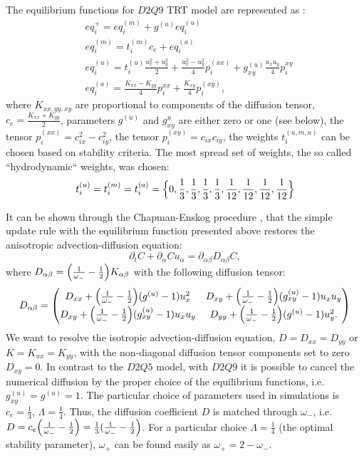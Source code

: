\documentclass{article}
\newcommand{\beq}{\begin{equation}}
\newcommand{\feq}{\end{equation}}
\newcommand{\omegaplus}{\omega_{+}}
\newcommand{\omegaminus}{\omega_{-}}
\begin{document}
The equilibrium functions for $D2Q9$ TRT model are represented as \cite{kuzmin-stability-optimal}:
\begin{equation}
\begin{aligned}
&eq_i^{+}=eq_i^{(m)}+g^{(u)} eq_i^{(u)}\\
&eq_i^{(m)}=t_i^{(m)} c_e+ eq_i^{(a)}\\
&eq_i^{(u)}=t_i^{(u)} \frac{u_x^2+u_y^2}{2}+\frac{u_x^2-u_y^2}{4} p_i^{(xx)}+g_{xy}^{(u)}\frac{u_x
u_y}{4} p_i^{xy}\\
&eq_i^{(a)}=\frac{K_{xx}-K_{yy}}{4} p_i^{xx}+\frac{K_{xy}}{4} p_i^{(xy)},
\end{aligned}
\end{equation}
where $K_{xx,yy,xy}$ are proportional to components of the diffusion tensor,
$c_e=\frac{K_{xx}+K_{yy}}{2}$, parameters $g^{(u)}$ and $g^{u}_{xy}$ are either zero or one (see
below), the tensor $p_i^{(xx)}=c_{ix}^2-c_{iy}^2$, the tensor $p_i^{(xy)}=c_{ix} c_{iy}$, the
weights
$t_i^{(u,m,a)}$ can be chosen based on stability criteria. The most spread set of weights, the so called
``hydrodynamic`` weights, was chosen:
\begin{equation}
t_i^{(u)}=t_i^{(m)}=t_i^{(a)}=\Bigl\{0,\frac{1}{3},\frac{1}{3},\frac{1}{3},\frac{1}{3},\frac{1}{12},
\frac {1}{12},\frac{1}{12},\frac{1}{12}\Bigr\}
\end{equation}
 
It can be shown through the Chapman-Enskog procedure \cite{chapman}, that the simple update rule
with the equilibrium function presented above restores the anisotropic
advection-diffusion equation:
\beq
\partial_t C+ \partial_{\alpha} C u_{\alpha}=\partial_{\alpha\beta} D_{\alpha\beta} C,
\feq
where $D_{\alpha\beta}=\Bigl(\frac{1}{\omegaminus}-\frac{1}{2}\Bigr)K_{\alpha\beta}$
with the
following diffusion tensor:
\begin{equation}
D_{\alpha\beta}=
\begin{pmatrix}
D_{xx} + \Bigl(\frac{1}{\omegaminus}-\frac{1}{2}\Bigr)(g^{(u)}-1) u_x^2 &
D_{xy}+\Bigl(\frac{1}{\omegaminus}-\frac{1}{2}\Bigr)(g_{xy}^{(u)}-1)u_x u_y\\
D_{xy} + \Bigl(\frac{1}{\omegaminus}-\frac{1}{2}\Bigr)(g_{xy}^{(u)}-1) u_x u_y&
D_{yy}+\Bigl(\frac{1}{\omegaminus}-\frac{1}{2}\Bigr)(g^{(u)}-1) u_y^2. 
\end{pmatrix}
\end{equation}
We want to resolve the isotropic advection-diffusion equation, $D=D_{xx}=D_{yy}$ or
$K=K_{xx}=K_{yy}$, with the non-diagonal diffusion tensor components set to zero $D_{xy}=0$. In
contrast to the $D2Q5$ model, with $D2Q9$ it is
possible to cancel the numerical diffusion by the proper choice
of the equilibrium functions, i.e. $g_{xy}^{(u)}=g^{(u)}=1$.  The particular choice of parameters
used in simulations is $c_e=\frac{1}{3}$, $\Lambda=\frac{1}{4}$. Thus, the diffusion coefficient $D$
is matched through $\omegaminus$, i.e. $D=c_e
\Bigl(\frac{1}{\omegaminus}-\frac{1}{2}\Bigr)=\frac{1}{3}(\frac{1}{\omegaminus}-\frac{1}{2}\Bigr)$.
For a particular choice $\Lambda=\frac{1}{4}$ (the optimal stability parameter), $\omegaplus$ can be found easily as
 $\omegaplus=2-\omegaminus$.  
\end{document}
